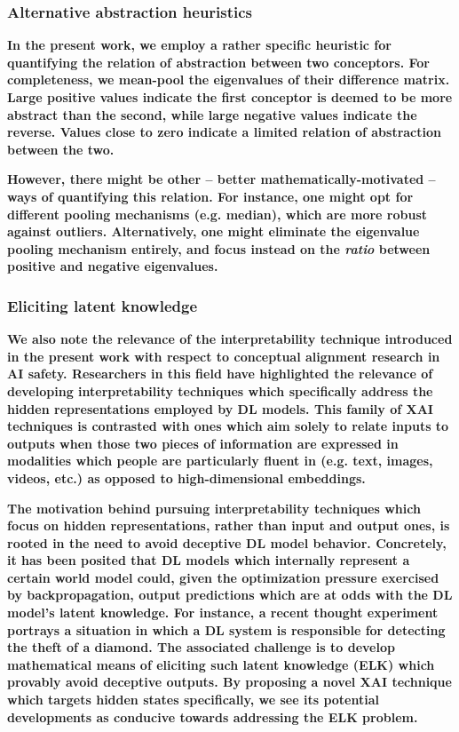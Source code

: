 \subsubsection{Alternative abstraction heuristics}

\textbf{In the present work, we employ a rather specific heuristic for quantifying the relation of abstraction between two conceptors. For completeness, we mean-pool the eigenvalues of their difference matrix. Large positive values indicate the first conceptor is deemed to be more abstract than the second, while large negative values indicate the reverse. Values close to zero indicate a limited relation of abstraction between the two.}

\textbf{However, there might be other -- better mathematically-motivated -- ways of quantifying this relation. For instance, one might opt for different pooling mechanisms (e.g. median), which are more robust against outliers. Alternatively, one might eliminate the eigenvalue pooling mechanism entirely, and focus instead on the \textit{ratio} between positive and negative eigenvalues.}

\subsubsection{Eliciting latent knowledge}

\textbf{We also note the relevance of the interpretability technique introduced in the present work with respect to conceptual alignment research in AI safety. Researchers in this field have highlighted the relevance of developing interpretability techniques which specifically address the hidden representations employed by DL models. This family of XAI techniques is contrasted with ones which aim solely to relate inputs to outputs when those two pieces of information are expressed in modalities which people are particularly fluent in (e.g. text, images, videos, etc.) as opposed to high-dimensional embeddings.}

\textbf{The motivation behind pursuing interpretability techniques which focus on hidden representations, rather than input and output ones, is rooted in the need to avoid deceptive DL model behavior. Concretely, it has been posited that DL models which internally represent a certain world model could, given the optimization pressure exercised by backpropagation, output predictions which are at odds with the DL model's latent knowledge. For instance, a recent thought experiment portrays a situation in which a DL system is responsible for detecting the theft of a diamond. The associated challenge is to develop mathematical means of eliciting such latent knowledge (ELK) which provably avoid deceptive outputs. By proposing a novel XAI technique which targets hidden states specifically, we see its potential developments as conducive towards addressing the ELK problem.}